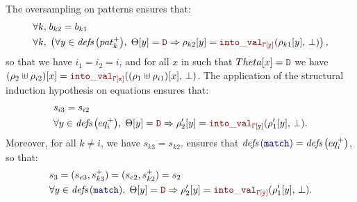\begin{skippableproof}
    The oversampling  on patterns
    ensures that:
    \begin{align*}
        \forall k, \; & b_{k2} = b_{k1}                                                                                                                      \\
        \forall k, \; & \left(\forall y \in \defs{pat_k^+}, \; \Theta[y] = \dType \Rightarrow \rho_{k2}[y] = \intoVal{\tyCtx[y]}{\rho_{k1}[y]}{\bot}\right),
    \end{align*}
    so that we have $i_1 = i_2 = i$, and for all $x$ in  such that $Theta[x]
        = \dType$ we have $(\rho_2 \ctxconcat \rho_{i2})[x] = \intoVal{\tyCtx[x]}{(\rho_1
            \ctxconcat \rho_{i1})[x]}{\bot}$.
    The application of the structural induction hypothesis on equations ensures that:
    \begin{align*}
         & s_{i3} = s_{i2}                                                                                                    \\
         & \forall y \in \defs{eq_i^+}, \; \Theta[y] = \dType \Rightarrow \rho'_2[y] = \intoVal{\tyCtx[y]}{\rho'_1[y]}{\bot}.
    \end{align*}
    Moreover, for all $k \neq i$, we have $s_{k3} = s_{k2}$.
     ensures that $\defs{\kwf{match}}
        = \defs{eq_i^+}$, so that:
    \begin{align*}
         & s_3 = (s_{e3}, s_{k3}^+) = (s_{e2}, s_{k2}^+) = s_2                                                                     \\
         & \forall y \in \defs{\kwf{match}}, \; \Theta[y] = \dType \Rightarrow \rho'_2[y] = \intoVal{\tyCtx[y]}{\rho'_1[y]}{\bot}.
    \end{align*}


\end{skippableproof}
